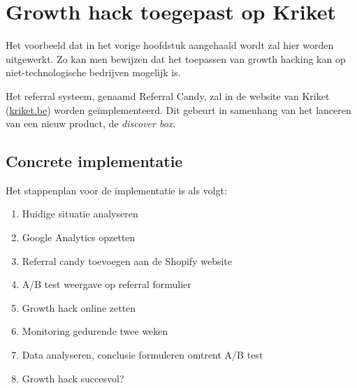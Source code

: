 
\chapter{Growth hack toegepast op Kriket}
\label{ch:implementatie}

Het voorbeeld dat in het vorige hoofdstuk aangehaald wordt zal hier worden uitgewerkt. Zo kan men bewijzen dat het toepassen van growth hacking kan op niet-technologische bedrijven mogelijk is. 

Het referral systeem, genaamd Referral Candy, zal in de website van Kriket (\href{https://kriket.be}{kriket.be}) worden geïmplementeerd. Dit gebeurt in samenhang van het lanceren van een nieuw product, de \emph{discover box}.

\section{Concrete implementatie}
\label{sec:concrete-implementatie}

Het stappenplan voor de implementatie is als volgt:

\begin{enumerate}
	\item Huidige situatie analyseren
	\item Google Analytics opzetten
	\item Referral candy toevoegen aan de Shopify website
	\item A/B test weergave op referral formulier
	\item Growth hack online zetten
	\item Monitoring gedurende twee weken
	\item Data analyseren, conclusie formuleren omtrent A/B test
	\item Growth hack succesvol?
\end{enumerate}